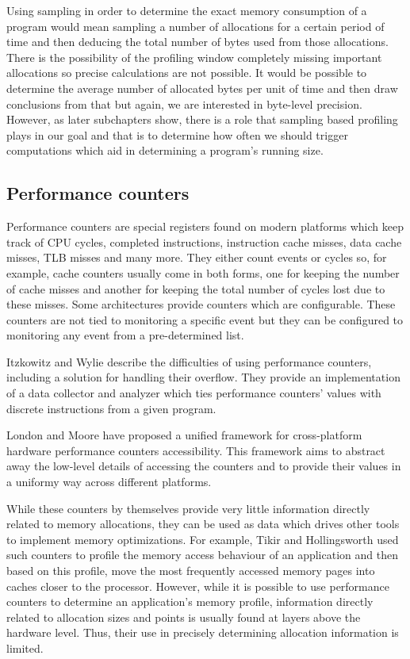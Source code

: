 Using sampling in order to determine the exact memory consumption of a program would mean sampling a number of allocations for a certain period of time and then deducing the total number of bytes used from those allocations. There is the possibility of the profiling window completely missing important allocations so precise calculations are not possible. It would be possible to determine the average number of allocated bytes per unit of time and then draw conclusions from that but again, we are interested in byte-level precision. However, as later subchapters show, there is a role that sampling based profiling plays in our goal and that is to determine how often we should trigger computations which aid in determining a program's running size.

\subsection{Performance counters}
\label{subsection:performancecounters}

Performance counters are special registers found on modern platforms which keep track of CPU cycles, completed instructions, instruction cache misses, data cache misses, TLB misses and many more. They either count events or cycles so, for example, cache counters usually come in both forms, one for keeping the number of cache misses and another for keeping the total number of cycles lost due to these misses. Some architectures provide counters which are configurable. These counters are not tied to monitoring a specific event but they can be configured to monitoring any event from a pre-determined list.

Itzkowitz and Wylie\cite{Itzkowitz03} describe the difficulties of using performance counters, including a solution for handling their overflow. They provide an implementation of a data collector and analyzer which ties performance counters' values with discrete instructions from a given program.

London and Moore have proposed a unified framework for cross-platform hardware performance counters accessibility\cite{London01}. This framework aims to abstract away the low-level details of accessing the counters and to provide their values in a uniformy way across different platforms.

While these counters by themselves provide very little information directly related to memory allocations, they can be used as data which drives other tools to implement memory optimizations. For example, Tikir and Hollingsworth\cite{Tikir04} used such counters to profile the memory access behaviour of an application and then based on this profile, move the most frequently accessed memory pages into caches closer to the processor. However, while it is possible to use performance counters to determine an application's memory profile, information directly related to allocation sizes and points is usually found at layers above the hardware level. Thus, their use in precisely determining allocation information is limited.

